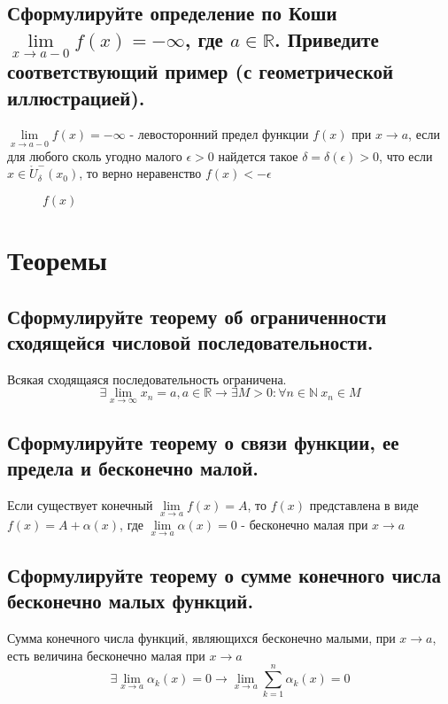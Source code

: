\documentclass[a4paper, 10pt]{article}
\newcommand{\image}[3]{
	\begin{figure}[ht]
		\center{\texttt{[image: img/\#1]} }
		\caption{\textit{#3}}\end{figure}
}
\begin{document}
    \subsection{Сформулируйте определение по Коши $\lim\limits_{x \to a-0} f (x) = -\infty$, где $a \in 
    \mathbb{R}$. Приведите соответствующий пример (с геометрической иллюстрацией).}

    $\lim\limits_{x \to a-0} f (x) = -\infty$ - левосторонний предел функции $f(x)$ при $x \to a$, если 
    для любого сколь угодно малого $\epsilon > 0$ найдется такое $\delta = \delta(\epsilon) > 0$, что если
    $x \in \mathring U_\delta^-(x_0)$, то верно неравенство $f(x) < -\epsilon$
    \image{4.png}{200}{$f(x)$}

\newpage
\section{Теоремы}

    \subsection{Сформулируйте теорему об ограниченности сходящейся числовой последовательности. }

    Всякая сходящаяся последовательность ограничена.
    $$\exists \lim\limits_{x \to \infty} x_n = a, a \in \mathbb{R} \rightarrow 
    \exists M > 0: \forall n \in \mathbb{N} \  x_n \in M$$

    \subsection{Сформулируйте теорему о связи функции, ее предела и бесконечно малой. }

    Если существует конечный $\lim\limits_{x \to a} f(x) = A$, то $f(x)$ представлена в виде
    $f(x) = A + \alpha  (x)$, где $\lim\limits_{x \to a} \alpha  (x) = 0$ - бесконечно малая при $x \to a$

    \subsection{Сформулируйте теорему о сумме конечного числа бесконечно малых функций. }

    Сумма конечного числа функций, являющихся бесконечно малыми, при $x \to a$, 
    есть величина бесконечно малая при $x \to a$
    $$\exists \lim\limits_{x \to a} \alpha _k (x) = 0 \rightarrow \lim\limits_{x \to a} 
    \sum\limits_{k=1}^n \alpha _k (x) = 0$$
\end{document}

